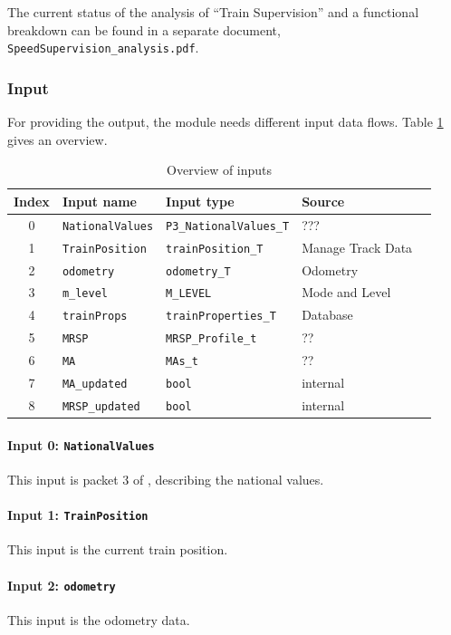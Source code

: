 The current status of the analysis of ``Train Supervision'' and a functional breakdown can be found in a separate document, \verb+SpeedSupervision_analysis.pdf+.



\subsubsection{Input}
For providing the output, the module needs different input data flows. Table \ref{tbl:speedsupervisionInput} gives an overview.

\begin{table}[H]
  \begin{tabular}{| c | l | l | l | l |}
    \hline
    \textbf{Index} & \textbf{Input name} & \textbf{Input type} & \textbf{Source}\\ \hline
    0 & \texttt{NationalValues} & \texttt{P3\_NationalValues\_T} & ???\\
    1 & \texttt{TrainPosition} & \texttt{trainPosition\_T} & Manage Track Data\\
    2 & \texttt{odometry} & \texttt{odometry\_T} & Odometry\\
    3 & \texttt{m\_level} & \texttt{M\_LEVEL} & Mode and Level\\
    4 & \texttt{trainProps} & \texttt{trainProperties\_T} & Database\\
    5 & \texttt{MRSP} & \texttt{MRSP\_Profile\_t} & ?? \\
    6 & \texttt{MA} & \texttt{MAs\_t} & ??\\
    7 & \texttt{MA\_updated} & \texttt{bool} & internal\\
    8 & \texttt{MRSP\_updated} & \texttt{bool} & internal\\
    \hline
  \end{tabular} 
  \caption{Overview of inputs}
  \label{tbl:speedsupervisionInput}
\end{table}

\paragraph{Input 0: \texttt{NationalValues}}
This input is packet 3 of \cite[Chapt.~8]{subset-026}, describing the national values. 
\paragraph{Input 1: \texttt{TrainPosition}}
This input is the current train position.
\paragraph{Input 2: \texttt{odometry}}
This input is the odometry data.
